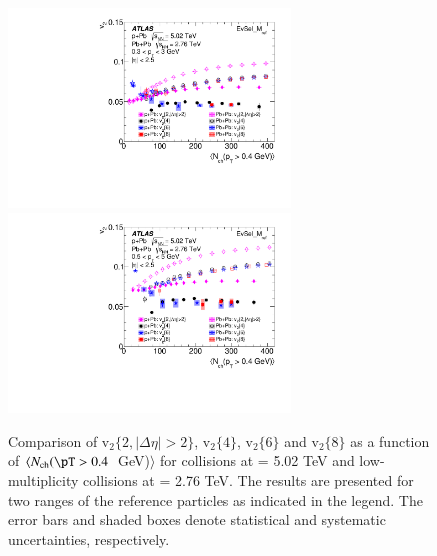 \documentclass[cernpreprint,texlive=2014,txfonts,UKenglish]{latex/atlasdoc}
\begin{document}
\begin{figure}[H]
\begin{center}
\includegraphics[width=75mm]{fig_10a.pdf}
\includegraphics[width=75mm]{fig_10b.pdf}
\caption{Comparison of $\mathrm{v}_2\{2,|\Delta\eta| > 2\}$,
$\mathrm{v}_2\{4\}$, $\mathrm{v}_2\{6\}$ and $\mathrm{v}_2\{8\}$ as a function of $\langle N_{\mathrm{ch}}(\pT > 0.4$~GeV)$\rangle$ for \pPb collisions at \sqn= 5.02 TeV and low-multiplicity \PbPb collisions at \sqn= 2.76 TeV. The results are presented for two \pT ranges of the reference particles as indicated in the legend. The error bars and shaded boxes denote statistical and systematic uncertainties, respectively.}
\label{fig:v2468} 
\end{center}
\end{figure} 
\end{document}

